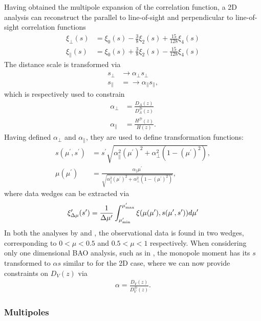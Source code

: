 \documentclass[titlesmallcaps, examinerscopy, copyrightpage]{uqthesis}
\begin{document}
Having obtained the multipole expansion of the correlation function, a 2D analysis can reconstruct the parallel to line-of-sight and perpendicular to line-of-sight correlation functions \citep{KazinSanchezBlanton2012, SanchezKazinBeutler2013}
\begin{align}
\xi_\perp(s) &= \xi_0(s) - \frac{3}{8} \xi_2(s) + \frac{15}{128} \xi_4(s) \\
\xi_\parallel(s) &= \xi_0(s) + \frac{3}{8} \xi_2(s) - \frac{15}{128} \xi_4(s)
\end{align}
The distance scale is transformed via
\begin{align}
s_\perp &\rightarrow \alpha_\perp s_\perp \\
s_\parallel &= \rightarrow \alpha_\parallel s_\parallel,
\end{align}
which is respectively used to constrain
\begin{align}
\alpha_\perp &= \frac{D_A(z)}{D_A^{\mathcal{D}}(z)} \\
\alpha_\parallel &= \frac{H^{\mathcal{D}}(z)}{H(z)}.
\end{align}
Having defined $\alpha_\perp$ and $\alpha_\parallel$, they are used to define transformation functions:
\begin{align}
s(\mu^\prime, s^\prime) &= s^\prime \sqrt{\alpha_\parallel^2(\mu^\prime)^2 + \alpha_\perp^2 (1 - (\mu^\prime)^2)}, \\
\mu(\mu^\prime) &= \frac{\alpha_\parallel \mu^\prime}{\sqrt{\alpha_\parallel^2(\mu^\prime)^2 + \alpha_\perp^2 (1 - (\mu^\prime)^2)}},
\end{align}
where data wedges can be extracted via
\begin{align}
\xi^\prime_{\Delta \mu}(s^\prime) = \frac{1}{\Delta \mu^\prime} \int_{\mu^\prime_{\rm{min}}}^{\mu^\prime_{\rm{max}}} \xi(\mu(\mu^\prime), s(\mu^\prime, s^\prime)) d\mu^\prime
\end{align}
In both the analyses by \citet{KazinSanchezBlanton2012} and \citet{SanchezKazinBeutler2013}, the observational data is found in two wedges, corresponding to $0 < \mu < 0.5$ and $0.5 < \mu < 1$ respectively. When considering only one dimensional BAO analysis, such as in \citet{BlakeDavis2011}, the monopole moment has its $s$ transformed to $\alpha s$ similar to for the 2D case, where we can now provide constraints on $D_V(z)$ via
\begin{align}
\alpha = \frac{D_V(z)}{D_V^{\mathcal{D}}(z)}.
\end{align}

\subsubsection{Multipoles}
\end{document}
